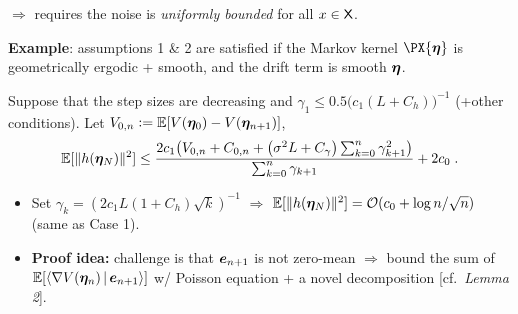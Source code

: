 \documentclass[a0,landscape]{a0poster}
\begin{document}
\begin{multicols}{3}
\begin{tcolorbox}[colback=white!5!white,colframe=red!75!black,fonttitle=\sffamily\bfseries\large,title=Analysis For State-dependent Markov Noise (Case 2)]
\begin{enumerate}
$\Longrightarrow$ requires the noise is \emph{\color{red}uniformly bounded} for all $x \in \mathsf{X}$.
\end{enumerate}
\textbf{Example}: assumptions 1 \& 2 are satisfied if the Markov kernel $\PX{\prm}$ is geometrically ergodic + smooth, and the drift term is smooth \wrt $\bm{\eta}$. 
\begin{theo}\vspace{-.5cm}Suppose that
the step sizes are decreasing and $\gamma_1 \leq 0.5 \big( c_1(L+C_h) \big)^{-1}$ (+other conditions). 
Let $V_{0,n} \mathrel{\mathop:}= \mathbb{E}[ V(\bm{\eta}_0) - V(\bm{\eta}_{n+1})]$,
{\large\[
 \EE [\| h( \prm_N ) \|^2 ] \leq
 \frac{ 2c_1 \big( V_{0,n} + C_{0,n} + \big( \sigma^2 L + C_\gamma \big) \sum_{k=0}^{n}
 \gamma_{k+1}^2 \big) }{ \sum_{k=0}^n \gamma_{k+1} } + 2 c_0 \eqsp.\vspace{-.1cm}
\]}
\end{theo}\vspace{-.2cm}
\begin{itemize}
\item Set $\gamma_k = (2 c_1 L (1+C_h) \sqrt{k})^{-1}$ $\Longrightarrow$ 
{\color{red}$\mathbb{E} [ \|h( \bm{\eta}_N ) \|^2 ] = {\cal O}( c_0 + \log n / \sqrt{n} )$} (same as Case 1).
\item \textbf{Proof idea:} challenge is that $\bm{e}_{n+1}$ is not zero-mean $\Longrightarrow$ bound the sum of $\mathbb{E}[ \left\langle {\nabla} V(\bm{\eta}_n) \,|\, \bm{e}_{n+1}  \right\rangle ]$ w/ Poisson equation + a novel decomposition [cf.~\emph{\color{blue}Lemma 2}].
\end{itemize}
\vspace{.1cm}
\end{tcolorbox}


\end{multicols}
\end{document}
